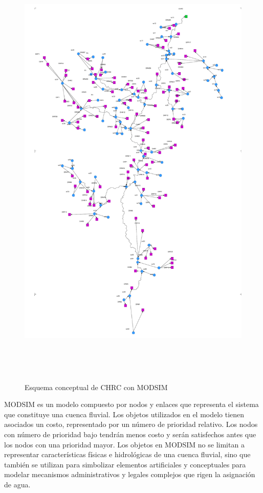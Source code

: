 \begin{figure}[h!]
    \begin{center}
      \includegraphics[height=8.5in]{Figures/modzim/figs.png}
      \caption{ Esquema conceptual de CHRC con MODSIM}
      \label{caudales}
    \end{center}
  \end{figure}

  MODSIM es un modelo compuesto por nodos y enlaces que representa el sistema que constituye una cuenca fluvial. 
  Los objetos utilizados en el modelo tienen asociados un costo, representado por un número de prioridad relativo. 
  Los nodos con número de prioridad bajo tendrán menos costo y serán satisfechos antes que los nodos con una prioridad
  mayor. Los objetos en MODSIM no se limitan a representar características físicas e hidrológicas de una cuenca 
  fluvial, sino que también se utilizan para simbolizar elementos artificiales y conceptuales para modelar mecanismos
   administrativos y legales complejos que rigen la asignación de agua. 

